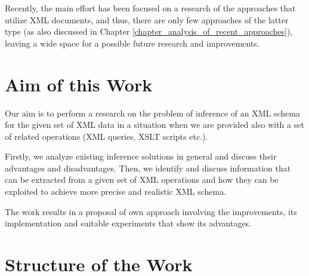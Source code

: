Recently, the main effort has been focused on a research of the approaches that utilize XML documents, and thus, there are only few approaches of the latter type (as also discussed in Chapter \ref{chapter_analysis_of_recent_approaches}), leaving a wide space for a possible future research and improvements.

\section{Aim of this Work}
Our aim is to perform a research on the problem of inference of an XML schema for the given set of XML data in a situation when we are provided also with a set of related operations (XML queries, XSLT scripts \cite{Clark:99:XTV} etc.).

Firstly, we analyze existing inference solutions in general and discuss their advantages and disadvantages. Then, we identify and discuss information that can be extracted from a given set of XML operations and how they can be exploited to achieve more precise and realistic XML schema.

The work results in a proposal of own approach involving the improvements, its implementation and suitable experiments that show its advantages.

\section{Structure of the Work}
